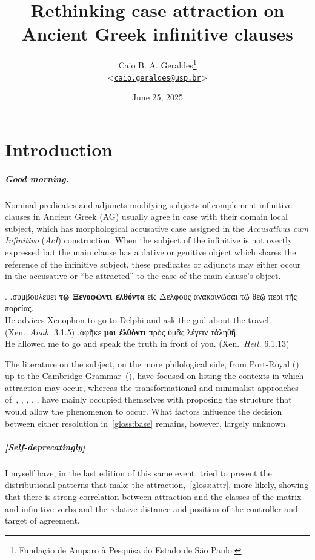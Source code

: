 \documentclass[a4paper, 12pt, article]{memoir}
\title{Rethinking case attraction on Ancient Greek infinitive clauses}
\author{
  Caio B. A. Geraldes\thanks{Fundação de Amparo à Pesquisa do Estado de São
  Paulo.}
	\\\smallskip
	<\href{mailto:caio.geraldes@usp.br}{\texttt{caio.geraldes@usp.br}}>
}
\date{June 25, 2025}
\begin{document}
\maketitle

\chapter{Introduction}\label{chap:introduction} %

\paragraph{Good morning.} 
Nominal predicates and adjuncts modifying subjects of complement infinitive
clauses in Ancient Greek (AG) usually agree in case with their domain local
subject, which has morphological accusative case assigned in the
\emph{Accusativus cum Infinitivo} (\emph{AcI}) construction.
When the subject of the infinitive is not overtly expressed but the main clause
has a dative or genitive object which shares the reference of the infinitive
subject, these predicates or adjuncts may either occur in the accusative or ``be
attracted'' to the case of the main clause's object.

\ex.\label{gloss:base}
\a.\label{gloss:noattr}συμβουλεύει \textbf{τῷ Ξενοφῶντι ἐλθόντα} {εἰς Δελφοὺς}
ἀνακοινῶσαι {τῷ θεῷ} {περὶ τῆς πορείας}.\\
He advices Xenophon to go to Delphi and ask the god about the travel.
(Xen.\ \emph{Anab.} 3.1.5)
\b.\label{gloss:attr}ἀφῆκε \textbf{μοι ἐλθόντι} {πρὸς ὑμᾶς} λέγειν τἀληθῆ.\\
He allowed me to go and speak the truth in front of you.
(Xen.\ \emph{Hell.} 6.1.13)


The literature on the subject, on the more philological side, from
Port\hyp{}Royal (\cite{Lancelot1658,Lancelot1709}) up to the Cambridge
Grammar~(\cite{Boas2019}), have focused on listing the contexts in which
attraction may occur, whereas the transformational and minimalist approaches
of~\textcite{Lakoff1970}, \textcite{Andrews1971}, \textcite{Quicoli1982},
\textcite{Spyropoulos2005}, \textcite{Tantalou2003},
\textcite{Sevdali2006,Sevdali2013} have mainly occupied themselves with
proposing the structure that would allow the phenomenon to occur.
What factors influence the decision between either resolution
in~\ref{gloss:base} remains, however, largely unknown.

\paragraph{[Self-deprecatingly]} I myself have, in the last edition of this
same event, tried to present the distributional patterns that make the
attraction,~\ref{gloss:attr}, more likely, showing that there is strong
correlation between attraction and the classes of the matrix and infinitive
verbs and the relative distance and position of the controller and target of
agreement.
\end{document}
